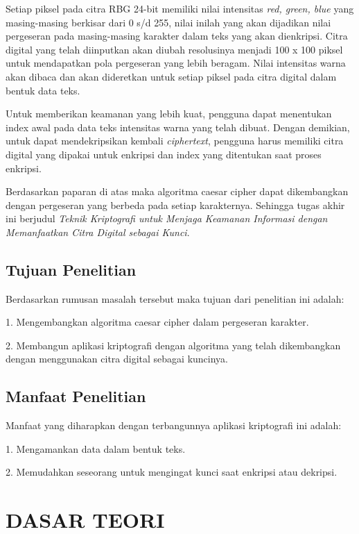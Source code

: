 \documentclass{jtetiproposalskripsi}
\begin{document}
Setiap piksel pada citra RBG 24-bit memiliki nilai intensitas \emph{red, green, blue} yang masing-masing berkisar dari 0 s/d 255, nilai inilah yang akan dijadikan nilai pergeseran pada masing-masing karakter dalam teks yang akan dienkripsi. Citra digital yang telah diinputkan akan diubah resolusinya menjadi 100 x 100 piksel untuk mendapatkan pola pergeseran yang lebih beragam. Nilai intensitas warna akan dibaca dan akan dideretkan untuk setiap piksel pada citra digital dalam bentuk data teks.

Untuk memberikan keamanan yang lebih kuat, pengguna dapat menentukan index awal pada data teks intensitas warna yang telah dibuat. Dengan demikian, untuk dapat mendekripsikan kembali \emph{ciphertext}, pengguna harus memiliki citra digital yang dipakai untuk enkripsi dan index yang ditentukan saat proses enkripsi.

Berdasarkan paparan di atas maka algoritma caesar cipher dapat dikembangkan dengan pergeseran yang berbeda pada setiap karakternya. Sehingga tugas akhir ini berjudul \emph{Teknik Kriptografi untuk Menjaga Keamanan Informasi dengan Memanfaatkan Citra Digital sebagai Kunci}.




\section{Tujuan Penelitian}
Berdasarkan rumusan masalah tersebut maka tujuan dari penelitian ini adalah:

1.	Mengembangkan algoritma caesar cipher dalam pergeseran karakter.

2.	Membangun aplikasi kriptografi dengan algoritma yang telah dikembangkan dengan menggunakan citra digital sebagai kuncinya.




\section{Manfaat Penelitian}
Manfaat yang diharapkan dengan terbangunnya aplikasi kriptografi ini adalah:

1.	Mengamankan data dalam bentuk teks.

2.	Memudahkan seseorang untuk mengingat kunci saat enkripsi atau dekripsi.


\chapter{DASAR TEORI}                
\end{document}
